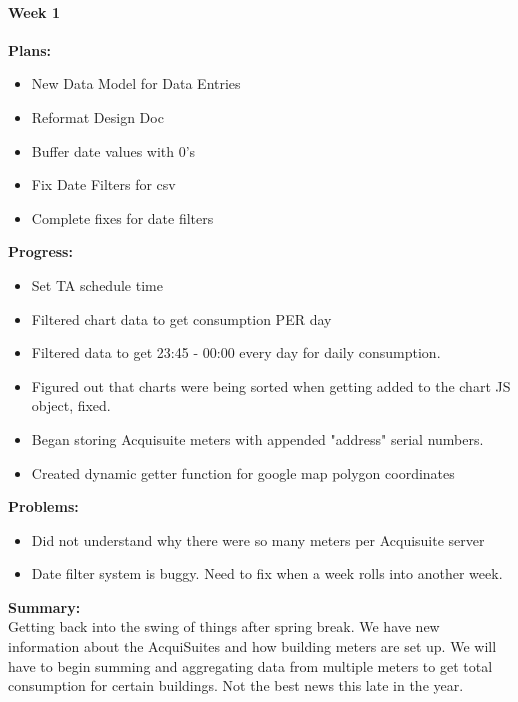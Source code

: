 \paragraph{Week 1}
\begin{adjustwidth}{2.5em}{0pt}
    \vspace{-0.5cm}\textbf{Plans:}
    \vspace{-0.5cm}
    \begin{itemize}
        \item New Data Model for Data Entries
        \item Reformat Design Doc
        \item Buffer date values with 0's
        \item Fix Date Filters for csv
        \item Complete fixes for date filters
    \end{itemize} 
    \vspace{-0.3cm}\textbf{Progress:}
    \vspace{-0.5cm}
    \begin{itemize}
        \item Set TA schedule time
        \item Filtered chart data to get consumption PER day
        \item Filtered data to get 23:45 - 00:00 every day for daily consumption.
        \item Figured out that charts were being sorted when getting added to the chart JS object, fixed.
        \item Began storing Acquisuite meters with appended "address" serial numbers.
        \item Created dynamic getter function for google map polygon coordinates
    
    \end{itemize} 
    \vspace{-0.3cm}\textbf{Problems:}
    \vspace{-0.5cm}
    \begin{itemize}
        \item Did not understand why there were so many meters per Acquisuite server
        \item Date filter system is buggy. Need to fix when a week rolls into another week.
    \end{itemize}  
    \vspace{-0.3cm}\noindent\textbf{Summary:}\\
    \noindent Getting back into the swing of things after spring break. We have new information about the AcquiSuites and how building meters are set up. We will have to begin summing and aggregating data from multiple meters to get total consumption for certain buildings. Not the best news this late in the year.
\end{adjustwidth}
